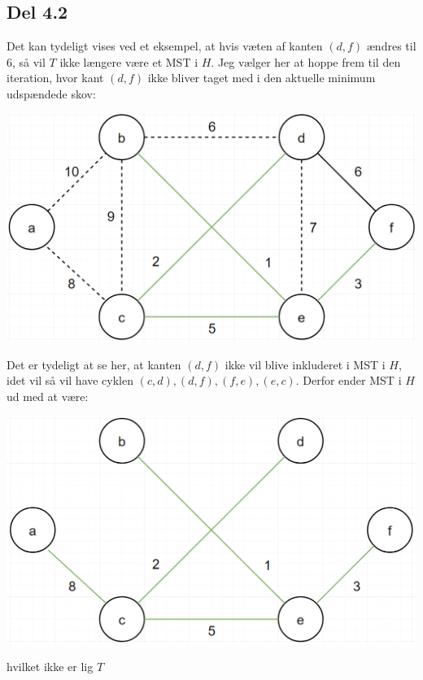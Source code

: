 \documentclass{report}
\begin{document}
\subsection*{Del 4.2}
Det kan tydeligt vises ved et eksempel, at hvis væten af kanten $(d, f)$ ændres til 6, så vil $T$ ikke længere være et MST i $H$. Jeg vælger her at hoppe frem til den iteration, hvor kant $(d, f)$ ikke bliver taget med i den aktuelle minimum udspændede skov:
\begin{center}
    \includegraphics[height = 5 cm]{../entities/new_kruskal1}
\end{center}
Det er tydeligt at se her, at kanten $(d, f)$ ikke vil blive inkluderet i MST i $H$, idet vil så vil have cyklen $(c, d), (d, f), (f, e), (e, c)$. Derfor ender MST i $H$ ud med at være:
\begin{center}
    \includegraphics[height = 5 cm]{../entities/new_kruskal2}
\end{center}
hvilket ikke er lig $T$

\newpage
\end{document}
